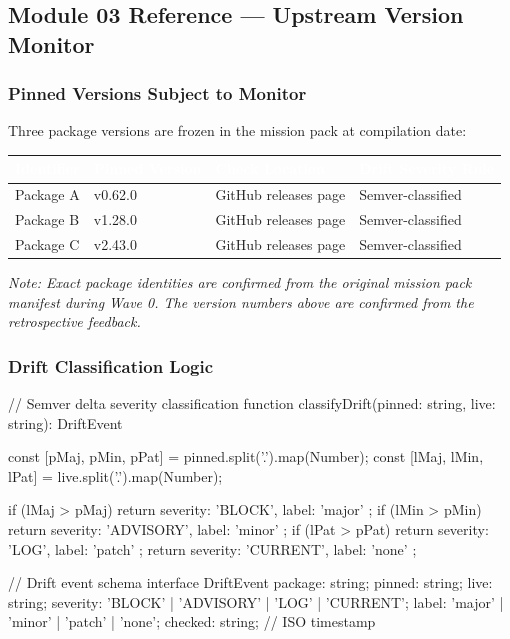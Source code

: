 \documentclass[11pt,letterpaper]{article}
\newcommand{\tableheader}[1]{\textbf{\sffamily\textcolor{white}{#1}}}
\begin{document}
\subsection{Module 03 Reference --- Upstream Version Monitor}

\subsubsection{Pinned Versions Subject to Monitor}

Three package versions are frozen in the mission pack at compilation date:

\begin{center}
\begin{tabularx}{\textwidth}{L{3cm}L{2.5cm}L{3cm}L{2.5cm}}
\toprule
{}
\tableheader{Identifier} & \tableheader{Pinned Version} & \tableheader{Check Location} & \tableheader{Drift Severity Rule} \\
\midrule
Package A & v0.62.0 & GitHub releases page & Semver-classified \\
Package B & v1.28.0 & GitHub releases page & Semver-classified \\
Package C & v2.43.0 & GitHub releases page & Semver-classified \\
\bottomrule
\end{tabularx}
\end{center}

\emph{Note: Exact package identities are confirmed from the original mission pack manifest during Wave 0. The version numbers above are confirmed from the retrospective feedback.}

\subsubsection{Drift Classification Logic}

\begin{asciibox}
// Semver delta severity classification
function classifyDrift(pinned: string, live: string): DriftEvent {
  const [pMaj, pMin, pPat] = pinned.split('.').map(Number);
  const [lMaj, lMin, lPat] = live.split('.').map(Number);

  if (lMaj > pMaj) return { severity: 'BLOCK',    label: 'major' };
  if (lMin > pMin) return { severity: 'ADVISORY',  label: 'minor' };
  if (lPat > pPat) return { severity: 'LOG',       label: 'patch' };
  return              { severity: 'CURRENT',   label: 'none'  };
}

// Drift event schema
interface DriftEvent {
  package:  string;
  pinned:   string;
  live:     string;
  severity: 'BLOCK' | 'ADVISORY' | 'LOG' | 'CURRENT';
  label:    'major' | 'minor' | 'patch' | 'none';
  checked:  string;  // ISO timestamp
}
\end{asciibox}
\end{document}
